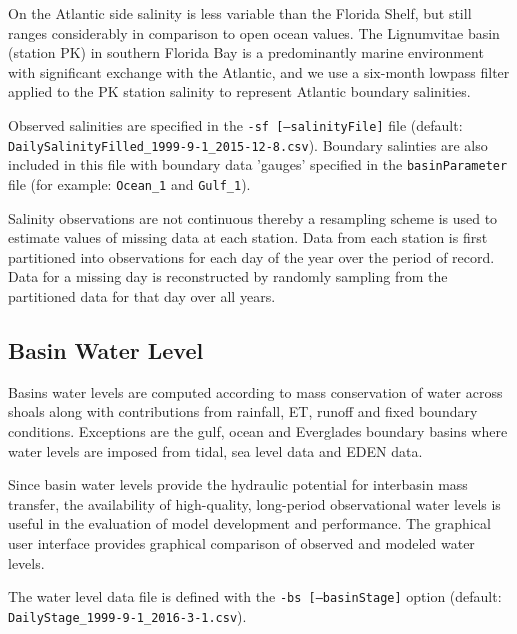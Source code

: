 On the Atlantic side salinity is less variable than the Florida Shelf, but still ranges considerably in comparison to open ocean values.  The Lignumvitae basin (station PK) in southern Florida Bay is a predominantly marine environment with significant exchange with the Atlantic, and we use a six-month lowpass filter applied to the PK station salinity to represent Atlantic boundary salinities.

Observed salinities are specified in the \texttt{-sf [--salinityFile]} file (default: \newline \texttt{DailySalinityFilled\_1999-9-1\_2015-12-8.csv}). Boundary salinties are also included in this file with boundary data 'gauges' specified in the \texttt{basinParameter} file (for example: \texttt{Ocean\_1} and \texttt{Gulf\_1}).

Salinity observations are not continuous thereby a resampling scheme is used to estimate values of missing data at each station.  Data from each station is first partitioned into observations for each day of the year over the period of record.  Data for a missing day is reconstructed by randomly sampling from the partitioned data for that day over all years.

\subsection{Basin Water Level}
\label{sec:Basin Water Level}
Basins water levels are computed according to mass conservation of water across shoals along with contributions from rainfall, ET, runoff and fixed boundary conditions.  Exceptions are the gulf, ocean and Everglades boundary basins where water levels are imposed from tidal, sea level data and EDEN data.  

Since basin water levels provide the hydraulic potential for interbasin mass transfer, the availability of high-quality, long-period observational water levels is useful in the evaluation of model development and performance.  The graphical user interface provides graphical comparison of observed and modeled water levels. 

The water level data file is defined with the \texttt{-bs [--basinStage]} option \newline (default: \texttt{DailyStage\_1999-9-1\_2016-3-1.csv}).

